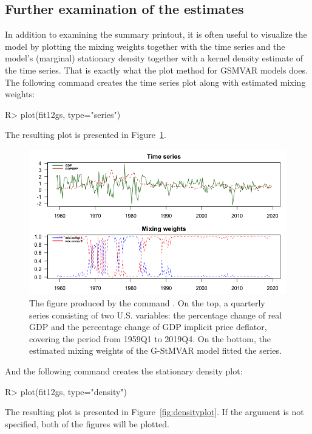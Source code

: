 \documentclass[nojss]{jss}
\begin{document}
\subsection{Further examination of the estimates}\label{sec:examestim}
In addition to examining the summary printout, it is often useful to visualize the model by plotting the mixing weights together with the time series and the model's (marginal) stationary density together with a kernel density estimate of the time series. That is exactly what the plot method for GSMVAR models does. The following command creates the time series plot along with estimated mixing weights:
%
\begin{CodeChunk}
\begin{CodeInput}
R> plot(fit12gs, type="series")
\end{CodeInput}
\end{CodeChunk}
%
The resulting plot is presented in Figure~\ref{fig:seriesplot}.

\begin{figure}[p]
  \centering
  \includegraphics{figures/seriesplot.png}
  \caption{The figure produced by the command . On the top, a quarterly series consisting of two U.S. variables: the percentage change of real GDP and the percentage change of GDP implicit price deflator, covering the period from 1959Q1 to 2019Q4. On the bottom, the estimated mixing weights of the G-StMVAR model  fitted the series.}
\label{fig:seriesplot}
\end{figure}

And the following command creates the stationary density plot:
%
\begin{CodeChunk}
\begin{CodeInput}
R> plot(fit12gs, type="density")
\end{CodeInput}
\end{CodeChunk}
%
The resulting plot is presented in Figure~\ref{fig:densityplot}. If the argument  is not specified, both of the figures will be plotted.
\end{document}
